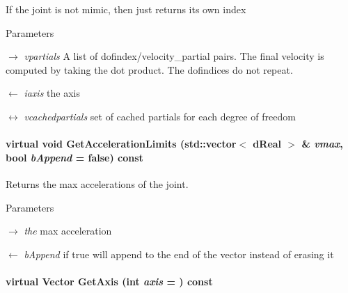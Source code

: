 If the joint is not mimic, then just returns its own index 
\begin{DoxyParams}{Parameters}
\item[\mbox{$\rightarrow$} {\em vpartials}]A list of dofindex/velocity\_\-partial pairs. The final velocity is computed by taking the dot product. The dofindices do not repeat. \item[\mbox{$\leftarrow$} {\em iaxis}]the axis \item[\mbox{$\leftrightarrow$} {\em vcachedpartials}]set of cached partials for each degree of freedom \end{DoxyParams}
\hypertarget{classOpenRAVE_1_1KinBody_1_1Joint_a1234a540b764968374f7454bda61b6e0}{
\paragraph[{GetAccelerationLimits}]{\setlength{\rightskip}{0pt plus 5cm}virtual void GetAccelerationLimits (std::vector$<$ dReal $>$ \& {\em vmax}, \/  bool {\em bAppend} = {\ttfamily false}) const}\hfill}
\label{classOpenRAVE_1_1KinBody_1_1Joint_a1234a540b764968374f7454bda61b6e0}


Returns the max accelerations of the joint. 


\begin{DoxyParams}{Parameters}
\item[\mbox{$\rightarrow$} {\em the}]max acceleration \item[\mbox{$\leftarrow$} {\em bAppend}]if true will append to the end of the vector instead of erasing it \end{DoxyParams}
\hypertarget{classOpenRAVE_1_1KinBody_1_1Joint_a35d06683756fe53bb8bc0809b7be21cb}{
\paragraph[{GetAxis}]{\setlength{\rightskip}{0pt plus 5cm}virtual Vector GetAxis (int {\em axis} = {}) const}\hfill}
\label{classOpenRAVE_1_1KinBody_1_1Joint_a35d06683756fe53bb8bc0809b7be21cb}


